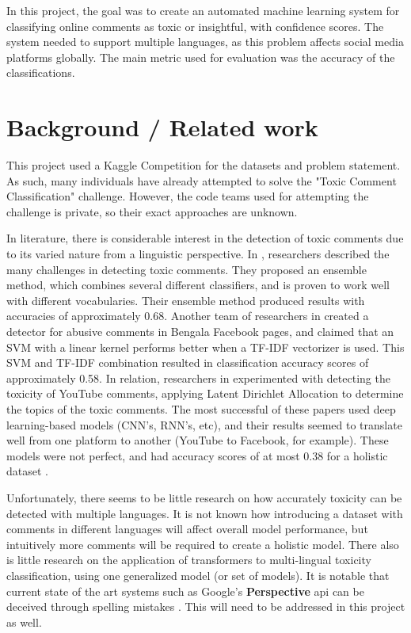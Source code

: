 \documentclass{article}
\begin{document}
In this project, the goal was to create an automated machine learning system for classifying online comments as toxic or insightful, with confidence scores. The system needed to support multiple languages, as this problem affects social media platforms globally. The main metric used for evaluation was the accuracy of the classifications.

\section{Background / Related work}

This project used a Kaggle Competition \cite{kaggle_competition} for the datasets and problem statement. As such, many individuals have already attempted to solve the "Toxic Comment Classification" challenge. However, the code teams used for attempting the challenge is private, so their exact approaches are unknown.

In literature, there is considerable interest in the detection of toxic comments \cite{almerekhi2019detecting} due to its varied nature from a linguistic perspective. In \cite{vanaken2018challenges}, researchers described the many challenges in detecting toxic comments. They proposed an ensemble method, which combines several different classifiers, and is proven to work well with different vocabularies. Their ensemble method produced results with accuracies of approximately 0.68. Another team of researchers in \cite{8660863} created a detector for abusive comments in Bengala Facebook pages, and claimed that an SVM with a linear kernel performs better when a TF-IDF vectorizer is used. This SVM and TF-IDF combination resulted in classification accuracy scores of approximately 0.58. In relation, researchers in \cite{obadimu2019identifying} experimented with detecting the toxicity of YouTube comments, applying Latent Dirichlet Allocation to determine the topics of the toxic comments. The most successful of these papers used deep learning-based models \cite{deep_learning_approaches} (CNN's, RNN's, etc), and their results seemed to translate well from one platform to another (YouTube to Facebook, for example). These models were not perfect, and had accuracy scores of at most 0.38 for a holistic dataset \cite{deep_learning_approaches}.

Unfortunately, there seems to be little research on how accurately toxicity can be detected with multiple languages. It is not known how introducing a dataset with comments in different languages will affect overall model performance, but intuitively more comments will be required to create a holistic model. There also is little research on the application of transformers to multi-lingual toxicity classification, using one generalized model (or set of models). It is notable that current state of the art systems such as Google's \textbf{Perspective} api can be deceived through spelling mistakes \cite{hosseini2017deceiving}. This will need to be addressed in this project as well.
\end{document}
